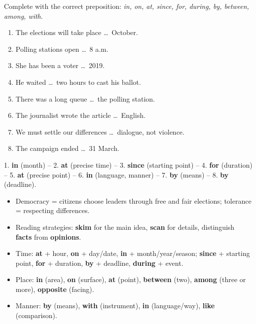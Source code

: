 \documentclass[11pt]{article}
\begin{document}
\begin{exercice}
Complete with the correct preposition: \emph{in, on, at, since, for, during, by, between, among, with}.
\begin{enumerate}
\item The elections will take place \ldots\ October.
\item Polling stations open \ldots\ 8 a.m.
\item She has been a voter \ldots\ 2019.
\item He waited \ldots\ two hours to cast his ballot.
\item There was a long queue \ldots\ the polling station.
\item The journalist wrote the article \ldots\ English.
\item We must settle our differences \ldots\ dialogue, not violence.
\item The campaign ended \ldots\ 31 March.
\end{enumerate}
\end{exercice}

\begin{corrige}
1. \textbf{in} (month) -- 2. \textbf{at} (precise time) -- 3. \textbf{since} (starting point) -- 4. \textbf{for} (duration) -- 5. \textbf{at} (precise point) -- 6. \textbf{in} (language, manner) -- 7. \textbf{by} (means) -- 8. \textbf{by} (deadline).
\end{corrige}

\begin{aretenir}
\begin{itemize}
\item Democracy = citizens choose leaders through free and fair elections; tolerance = respecting differences.
\item Reading strategies: \textbf{skim} for the main idea, \textbf{scan} for details, distinguish \textbf{facts} from \textbf{opinions}.
\item Time: \textbf{at} + hour, \textbf{on} + day/date, \textbf{in} + month/year/season; \textbf{since} + starting point, \textbf{for} + duration, \textbf{by} + deadline, \textbf{during} + event.
\item Place: \textbf{in} (area), \textbf{on} (surface), \textbf{at} (point), \textbf{between} (two), \textbf{among} (three or more), \textbf{opposite} (facing).
\item Manner: \textbf{by} (means), \textbf{with} (instrument), \textbf{in} (language/way), \textbf{like} (comparison).
\end{itemize}
\end{aretenir}
\end{document}
